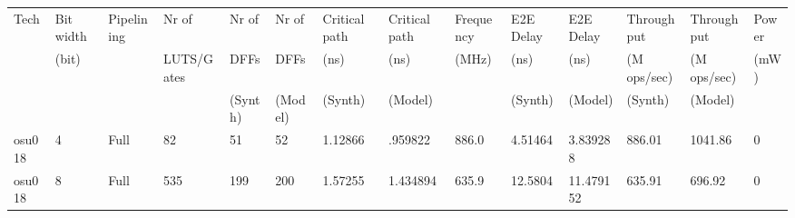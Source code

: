 \begin{tabular}{llllllllllllll}
\hline
\hline
 {Tech}   & {Bit width} & {Pipelining} & {Nr of}      & {Nr of}   & {Nr of}   & {Critical path} & {Critical path} & {Frequency} & {E2E Delay} & {E2E Delay} & {Throughput}  & {Throughput}  & {Power} \\
          & {(bit)}     &              & {LUTS/Gates} & {DFFs}    & {DFFs}    & {(ns)}          & {(ns)}          & {(MHz)}     & {(ns)}      & {(ns)}      & {(M ops/sec)} & {(M ops/sec)} & {(mW)}  \\
          &             &              &              & {(Synth)} & {(Model)} & {(Synth)}       & {(Model)}       &             & {(Synth)}   & {(Model)}   & {(Synth)}     & {(Model)}     &         \\
 {osu018} & 4           & {Full}       & 82           & 51        & 52        & 1.12866         & .959822         & 886.0       & 4.51464     & 3.839288    & 886.01        & 1041.86       & 0       \\
 {osu018} & 8           & {Full}       & 535          & 199       & 200       & 1.57255         & 1.434894        & 635.9       & 12.5804     & 11.479152   & 635.91        & 696.92        & 0       \\
\hline
\end{tabular}
